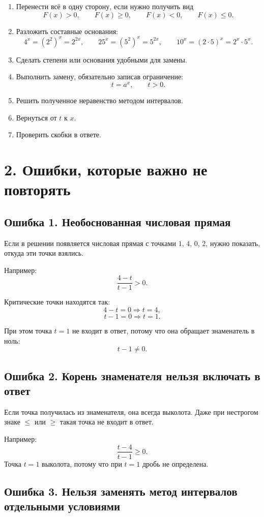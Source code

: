 \documentclass[a4paper,12pt]{article}
\begin{document}
\begin{enumerate}[label=\textbf{\arabic*.}, leftmargin=8mm]
\item Перенести всё в одну сторону, если нужно получить вид
\[
F(x)>0,\qquad F(x)\ge0,\qquad F(x)<0,\qquad F(x)\le0.
\]
\item Разложить составные основания:
\[
4^x=(2^2)^x=2^{2x},\qquad
25^x=(5^2)^x=5^{2x},\qquad
10^x=(2\cdot5)^x=2^x\cdot5^x.
\]
\item Сделать степени или основания удобными для замены.
\item Выполнить замену, обязательно записав ограничение:
\[
t=a^x,\qquad t>0.
\]
\item Решить полученное неравенство методом интервалов.
\item Вернуться от \(t\) к \(x\).
\item Проверить скобки в ответе.
\end{enumerate}

\section*{2. Ошибки, которые важно не повторять}

\subsection*{Ошибка 1. Необоснованная числовая прямая}

Если в решении появляется числовая прямая с точками \(1\), \(4\), \(0\), \(2\), нужно показать, откуда эти точки взялись.

Например:
\[
\frac{4-t}{t-1}>0.
\]

Критические точки находятся так:
\[
4-t=0 \Rightarrow t=4,
\]
\[
t-1=0 \Rightarrow t=1.
\]

При этом точка \(t=1\) не входит в ответ, потому что она обращает знаменатель в ноль:
\[
t-1\ne0.
\]

\subsection*{Ошибка 2. Корень знаменателя нельзя включать в ответ}

Если точка получилась из знаменателя, она всегда выколота. Даже при нестрогом знаке \(\le\) или \(\ge\) такая точка не входит в ответ.

Например:
\[
\frac{t-4}{t-1}\ge0.
\]
Точка \(t=1\) выколота, потому что при \(t=1\) дробь не определена.

\subsection*{Ошибка 3. Нельзя заменять метод интервалов отдельными условиями}
\end{document}
